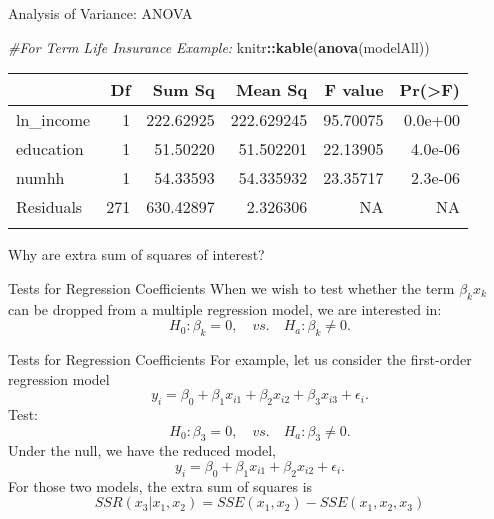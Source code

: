 \documentclass[
  ignorenonframetext,
]{beamer}
\newenvironment{Shaded}{\begin{snugshade}}{\end{snugshade}}
\newcommand{\CommentTok}[1]{\textcolor[rgb]{0.56,0.35,0.01}{\textit{#1}}}
\newcommand{\FunctionTok}[1]{\textcolor[rgb]{0.13,0.29,0.53}{\textbf{#1}}}
\newcommand{\NormalTok}[1]{#1}
\newcommand{\SpecialCharTok}[1]{\textcolor[rgb]{0.81,0.36,0.00}{\textbf{#1}}}
\begin{document}
\begin{frame}[fragile]{Analysis of Variance: ANOVA}
\protect\hypertarget{analysis-of-variance-anova-1}{}
\normalsize

\begin{Shaded}
\begin{Highlighting}[]
\CommentTok{\#For Term Life Insurance Example:}
\NormalTok{knitr}\SpecialCharTok{::}\FunctionTok{kable}\NormalTok{(}\FunctionTok{anova}\NormalTok{(modelAll))}
\end{Highlighting}
\end{Shaded}

\begin{longtable}[]{@{}lrrrrr@{}}
\toprule\noalign{}
& Df & Sum Sq & Mean Sq & F value & Pr(\textgreater F) \\
\midrule\noalign{}
\endhead
ln\_income & 1 & 222.62925 & 222.629245 & 95.70075 & 0.0e+00 \\
education & 1 & 51.50220 & 51.502201 & 22.13905 & 4.0e-06 \\
numhh & 1 & 54.33593 & 54.335932 & 23.35717 & 2.3e-06 \\
Residuals & 271 & 630.42897 & 2.326306 & NA & NA \\
\bottomrule\noalign{}
\end{longtable}

\normalsize

Why are extra sum of squares of interest?
\end{frame}

\begin{frame}{Tests for Regression Coefficients}
\protect\hypertarget{tests-for-regression-coefficients}{}
When we wish to test whether the term \(\beta_kx_k\) can be dropped from
a multiple regression model, we are interested in:
\[H_0:\beta_k=0, \quad vs. \quad H_a: \beta_k \neq 0.\]
\end{frame}

\begin{frame}{Tests for Regression Coefficients}
\protect\hypertarget{tests-for-regression-coefficients-1}{}
For example, let us consider the first-order regression model
\[y_i=\beta_0+\beta_1 x_{i1}+\beta_2 x_{i2}+\beta_3 x_{i3}+\epsilon_i.\]
Test: \[H_0:\beta_3=0, \quad vs. \quad H_a: \beta_3\neq 0.\] Under the
null, we have the reduced model,
\[y_i=\beta_0+\beta_1 x_{i1}+\beta_2 x_{i2}+\epsilon_i.\] For those two
models, the extra sum of squares is
\[SSR(x_3|x_1,x_2)=SSE(x_1,x_2)-SSE(x_1,x_2,x_3)\]
\end{frame}
\end{document}
